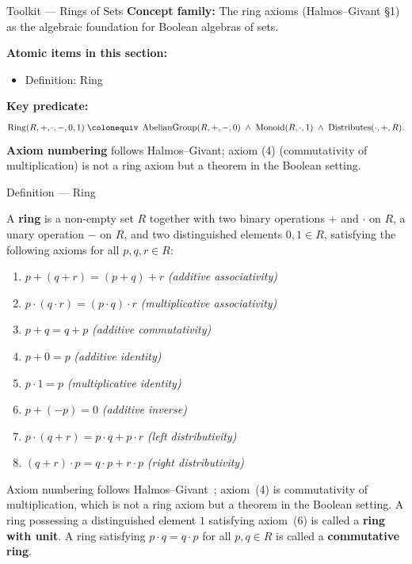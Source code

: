 
\begin{toolkitbox}{Toolkit --- Rings of Sets}
\textbf{Concept family:} The ring axioms (Halmos--Givant §1) as the algebraic
foundation for Boolean algebras of sets.

\medskip
\textbf{Atomic items in this section:}
\begin{itemize}
  \item Definition: Ring
\end{itemize}

\medskip
\textbf{Key predicate:}
\[
  \operatorname{Ring}(R,+,\cdot,-,0,1)
  \;\colonequiv\;
  \operatorname{AbelianGroup}(R,+,-,0)
  \;\land\;
  \operatorname{Monoid}(R,\cdot,1)
  \;\land\;
  \operatorname{Distributes}(\cdot,+,R).
\]
\textbf{Axiom numbering} follows Halmos--Givant; axiom (4) (commutativity of
multiplication) is not a ring axiom but a theorem in the Boolean setting.
\end{toolkitbox}

\begin{definitionbox}{Definition --- Ring}
\begin{definition}[Ring]
\label{def:ring}
A \textbf{ring} is a non-empty set $R$ together with two binary
operations $+$ and $\cdot$ on $R$, a unary operation $-$ on $R$,
and two distinguished elements $0, 1 \in R$, satisfying the
following axioms for all $p, q, r \in R$:
\begin{enumerate}
  \item[(1)] $p + (q + r) = (p + q) + r$
             \hfill\textit{(additive associativity)}
  \item[(2)] $p \cdot (q \cdot r) = (p \cdot q) \cdot r$
             \hfill\textit{(multiplicative associativity)}
  \item[(3)] $p + q = q + p$
             \hfill\textit{(additive commutativity)}
  \item[(5)] $p + 0 = p$
             \hfill\textit{(additive identity)}
  \item[(6)] $p \cdot 1 = p$
             \hfill\textit{(multiplicative identity)}
  \item[(7)] $p + (-p) = 0$
             \hfill\textit{(additive inverse)}
  \item[(8)] $p \cdot (q + r) = p \cdot q + p \cdot r$
             \hfill\textit{(left distributivity)}
  \item[(9)] $(q + r) \cdot p = q \cdot p + r \cdot p$
             \hfill\textit{(right distributivity)}
\end{enumerate}
Axiom numbering follows Halmos--Givant~\cite{HalmosGivant2009};
axiom~(4) is commutativity of multiplication, which is not a ring
axiom but a theorem in the Boolean setting.
A ring possessing a distinguished element $1$ satisfying
axiom~(6) is called a \textbf{ring with unit}.
A ring satisfying $p \cdot q = q \cdot p$ for all $p, q \in R$
is called a \textbf{commutative ring}.
\end{definition}
\end{definitionbox}

